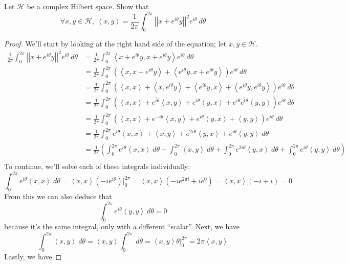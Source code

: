 \documentclass{article}
\newcommand{\norm}[1]{\left|\left|#1\right|\right|}
\newcommand{\parens}[1]{\left(#1\right)}
\newcommand{\hilbert}{\mathcal{H}}
\newcommand{\abracks}[1]{\left< #1\right>}
\begin{document}
    \item Let $\hilbert$ be a complex Hilbert space. Show that 
    $$\forall x,y \in \hilbert,\ \abracks{x,y} = \frac{1}{2\pi}\int_0^{2\pi}\norm{x + 
    e^{i\theta}y}^2 e^{i\theta}\ d\theta$$
    \begin{proof}
    We'll start by looking at the right hand side of the equation; let $x,y \in \hilbert$.
    \begin{align*}
    \frac{1}{2\pi}\int_0^{2\pi}\norm{x + e^{i\theta}y}^2 e^{i\theta}\ d\theta &= 
    \frac{1}{2\pi}\int_0^{2\pi}\abracks{x + e^{i\theta}y, x+e^{i\theta}y}e^{i\theta}\ d\theta \\
    &= \frac{1}{2\pi}\int_0^{2\pi}\parens{\abracks{x,x + e^{i\theta}y} + \abracks{e^{i\theta}y,
    x+e^{i\theta}y}}e^{i\theta}\ d\theta \\
    &= \frac{1}{2\pi}\int_0^{2\pi}\parens{\abracks{x,x} + \abracks{x, e^{i\theta}y} + 
    \abracks{e^{i\theta}y, x} +\abracks{e^{i\theta}y,e^{i\theta}y}}e^{i\theta}\ d\theta \\
    &= \frac{1}{2\pi}\int_0^{2\pi}\parens{\abracks{x,x} + \overline{e^{i\theta}}\abracks{x, y} + 
    e^{i\theta}\abracks{y, x} +e^{i\theta}\overline{e^{i\theta}}\abracks{y,y}}e^{i\theta}
    \ d\theta \\
    &= \frac{1}{2\pi}\int_0^{2\pi}\parens{\abracks{x,x} + e^{-i\theta}\abracks{x, y} + 
    e^{i\theta}\abracks{y, x} + \abracks{y,y}}e^{i\theta}\ d\theta \\
    &= \frac{1}{2\pi}\int_0^{2\pi}e^{i\theta}\abracks{x,x} + \abracks{x, y} + 
    e^{2i\theta}\abracks{y, x} + e^{i\theta}\abracks{y,y}\ d\theta \\
    &= \frac{1}{2\pi}\parens{\int_0^{2\pi}e^{i\theta}\abracks{x,x}\ d\theta + 
    \int_0^{2\pi}\abracks{x, y}\ d\theta + \int_0^{2\pi} e^{2i\theta}\abracks{y, x}\ d\theta 
    + \int_0^{2\pi} e^{i\theta}\abracks{y,y}\ d\theta} \\
    \end{align*}
    To continue, we'll solve each of these integrals individually:
    $$\int_0^{2\pi}e^{i\theta}\abracks{x,x}\ d\theta = \abracks{x,x}\parens{-ie^{i\theta}}
    \Big|_0^{2\pi} = \abracks{x,x}\parens{-ie^{2\pi i} +ie^0} = \abracks{x,x}(-i+i) = 0$$
    From this we can also deduce that
    $$\int_0^{2\pi}e^{i\theta}\abracks{y,y}\ d\theta = 0$$
    because it's the same integral, only with a different ``scalar''. Next, we have
    $$\int_0^{2\pi}\abracks{x, y}\ d\theta = \abracks{x,y} \int_0^{2\pi}\ d\theta =
    \abracks{x,y} \theta\Big|_0^{2\pi} = 2\pi\abracks{x,y}$$
    Lastly, we have

\end{proof}
\end{document}
